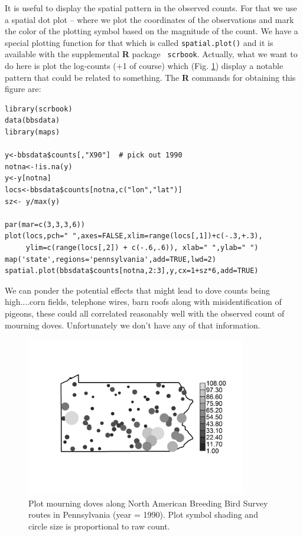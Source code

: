 It is useful to display the spatial pattern in the observed
counts. For that we use a spatial dot plot -- where we plot the
coordinates of the observations and mark the color of the plotting
symbol based on the magnitude of the count.  We have a special
plotting function for that which is called \mbox{\tt spatial.plot()}
and it is available with the supplemental {\bf R} package \mbox{\tt
  scrbook}.  Actually, what we want to do here is plot the log-counts
(+1 of course) which (Fig. \ref{glms.fig.padovecounts}) display a
notable pattern that could be related to something. The {\bf R}
commands for obtaining this figure are: 
{\small
\begin{verbatim}
library(scrbook)
data(bbsdata)
library(maps)

y<-bbsdata$counts[,"X90"]  # pick out 1990
notna<-!is.na(y)
y<-y[notna]
locs<-bbsdata$counts[notna,c("lon","lat")]
sz<- y/max(y)

par(mar=c(3,3,3,6))
plot(locs,pch=" ",axes=FALSE,xlim=range(locs[,1])+c(-.3,+.3),
     ylim=c(range(locs[,2]) + c(-.6,.6)), xlab=" ",ylab=" ")
map('state',regions='pennsylvania',add=TRUE,lwd=2)
spatial.plot(bbsdata$counts[notna,2:3],y,cx=1+sz*6,add=TRUE)
\end{verbatim}
}
We can ponder the potential effects that
might lead to dove counts being high....corn fields, telephone wires,
barn roofs along with misidentification of pigeons, these could all
correlated reasonably well with the observed count of mourning doves.
Unfortunately we don't have any of that information.
\begin{figure}
\begin{center}
\includegraphics[height=2.75in]{Ch3-Bayes/figs/pacounts}
\end{center}
\caption{ Plot mourning doves along North American Breeding Bird
  Survey routes in Pennsylvania (year = 1990). Plot symbol shading and
  circle size is proportional to raw count. }
\label{glms.fig.padovecounts}
\end{figure}
